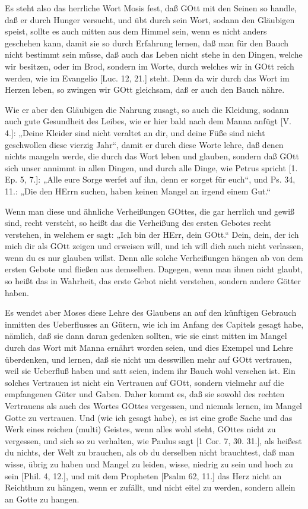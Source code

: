 Es steht also das herrliche Wort Mosis fest, daß GOtt mit den Seinen so handle, daß er durch Hunger versucht, und übt durch sein Wort, sodann den Gläubigen speist, sollte es auch mitten aus dem Himmel sein, wenn es nicht anders geschehen kann, damit sie so durch Erfahrung lernen, daß man für den Bauch nicht bestimmt sein müsse, daß auch das Leben nicht stehe in den Dingen, welche wir besitzen, oder im Brod, sondern im Worte, durch welches wir in GOtt reich werden, wie im Evangelio [Luc. 12, 21.] steht. Denn da wir durch das Wort im Herzen leben, so zwingen wir GOtt gleichsam, daß er auch den Bauch nähre.

Wie er aber den Gläubigen die Nahrung zusagt, so auch die Kleidung, sodann auch gute Gesundheit des Leibes, wie er hier bald nach dem Manna anfügt [V. 4.]: „Deine Kleider sind nicht veraltet an dir, und deine Füße sind nicht geschwollen diese vierzig Jahr“, damit er durch diese Worte lehre, daß denen nichts mangeln werde, die durch das Wort leben und glauben, sondern daß GOtt sich unser annimmt in allen Dingen, und durch alle Dinge, wie Petrus spricht [1. Ep. 5, 7.]: „Alle eure Sorge werfet auf ihn, denn er sorget für euch“, und Ps. 34, 11.: „Die den HErrn suchen, haben keinen Mangel an irgend einem Gut.“

Wenn man diese und ähnliche Verheißungen GOttes, die gar herrlich und gewiß sind, recht versteht, so heißt das die Verheißung des ersten
Gebotes recht verstehen, in welchem er sagt: „Ich bin der HErr, dein GOtt.“ Dein, dein, der ich mich dir als GOtt zeigen und erweisen will, und ich will dich auch nicht verlassen, wenn du es nur glauben willst. Denn alle solche Verheißungen hängen ab von dem ersten Gebote und fließen aus demselben. Dagegen, wenn man ihnen nicht glaubt, so heißt das in Wahrheit, das erste Gebot nicht verstehen, sondern andere Götter haben.

Es wendet aber Moses diese Lehre des Glaubens an auf den künftigen Gebrauch inmitten des Ueberflusses an Gütern, wie ich im Anfang des Capitels gesagt habe, nämlich, daß sie dann daran gedenken sollten, wie sie einst mitten im Mangel durch das Wort mit Manna ernährt worden seien, und dies Exempel und Lehre überdenken, und lernen, daß sie nicht um desswillen mehr auf GOtt vertrauen, weil sie Ueberfluß haben und satt seien, indem ihr Bauch wohl versehen ist. Ein solches Vertrauen ist nicht ein Vertrauen auf GOtt, sondern vielmehr auf die empfangenen Güter und Gaben. Daher kommt es, daß sie sowohl des rechten Vertrauens als auch des Wortes GOttes vergessen, und niemals lernen, im Mangel Gotte zu vertrauen. Und (wie ich gesagt habe), es ist eine große Sache und das Werk eines reichen (multi) Geistes, wenn alles wohl steht, GOttes nicht zu vergessen, und sich so zu verhalten, wie Paulus sagt [1 Cor. 7, 30. 31.], als heißest du nichts, der Welt zu brauchen, als ob du derselben nicht brauchtest, daß man wisse, übrig zu haben und Mangel zu leiden, wisse, niedrig zu sein und hoch zu sein [Phil. 4, 12.], und mit dem Propheten [Psalm 62, 11.] das Herz nicht an Reichthum zu hängen, wenn er zufällt, und nicht eitel zu werden, sondern allein an Gotte zu hangen.


